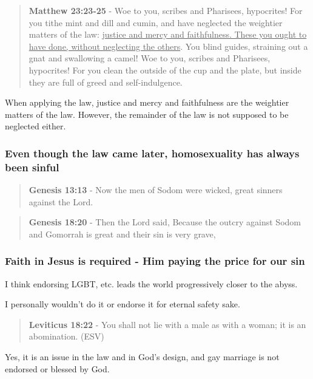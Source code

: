 \documentclass[11pt]{article}
\begin{document}
\begin{quote}
\textbf{Matthew 23:23-25} - Woe to you, scribes and Pharisees, hypocrites! For you tithe mint and dill and cumin, and have neglected the weightier matters of the law: \uline{justice and mercy and faithfulness. These you ought to have done, without neglecting the others}.  You blind guides, straining out a gnat and swallowing a camel!  Woe to you, scribes and Pharisees, hypocrites! For you clean the outside of the cup and the plate, but inside they are full of greed and self-indulgence.
\end{quote}

When applying the law, justice and mercy and faithfulness are the weightier matters of the law.
However, the remainder of the law is not supposed to be neglected either.

\subsubsection{Even though the law came later, homosexuality has always been sinful}
\label{sec:orgdbafd24}
\begin{quote}
\textbf{Genesis 13:13} - Now the men of Sodom were wicked, great sinners against the Lord.
\end{quote}

\begin{quote}
\textbf{Genesis 18:20} - Then the Lord said, Because the outcry against Sodom and Gomorrah is great and their sin is very grave,
\end{quote}

\subsubsection{Faith in Jesus is required - Him paying the price for our sin}
\label{sec:org5f96eb0}

I think endorsing LGBT, etc. leads the world progressively closer to the abyss.

I personally wouldn't do it or endorse it for eternal safety sake.

\begin{quote}
\textbf{Leviticus 18:22} - You shall not lie with a male as with a woman; it is an abomination. (ESV)
\end{quote}

Yes, it is an issue in the law and in God's design, and gay marriage is not endorsed or blessed by God.
\end{document}

